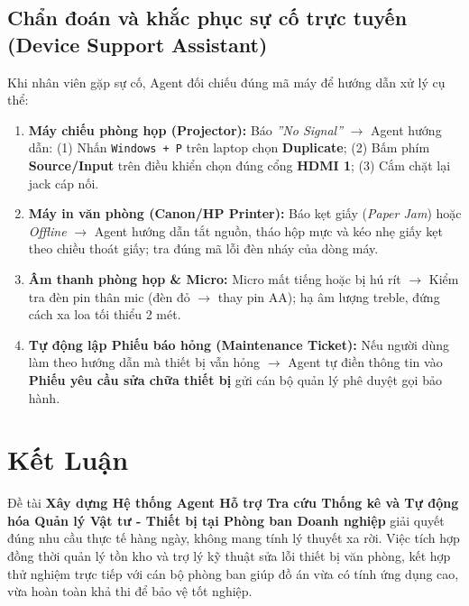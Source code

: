 \documentclass[11pt,a4paper]{article}
\begin{document}
\subsection{Chẩn đoán và khắc phục sự cố trực tuyến (Device Support Assistant)}
Khi nhân viên gặp sự cố, Agent đối chiếu đúng mã máy để hướng dẫn xử lý cụ thể:
\begin{enumerate}
    \item \textbf{Máy chiếu phòng họp (Projector):} Báo \textit{''No Signal''} $\rightarrow$ Agent hướng dẫn: (1) Nhấn \texttt{Windows + P} trên laptop chọn \textbf{Duplicate}; (2) Bấm phím \textbf{Source/Input} trên điều khiển chọn đúng cổng \textbf{HDMI 1}; (3) Cắm chặt lại jack cáp nối.
    \item \textbf{Máy in văn phòng (Canon/HP Printer):} Báo kẹt giấy (\textit{Paper Jam}) hoặc \textit{Offline} $\rightarrow$ Agent hướng dẫn tắt nguồn, tháo hộp mực và kéo nhẹ giấy kẹt theo chiều thoát giấy; tra đúng mã lỗi đèn nháy của dòng máy.
    \item \textbf{Âm thanh phòng họp \& Micro:} Micro mất tiếng hoặc bị hú rít $\rightarrow$ Kiểm tra đèn pin thân mic (đèn đỏ $\rightarrow$ thay pin AA); hạ âm lượng treble, đứng cách xa loa tối thiểu 2 mét.
    \item \textbf{Tự động lập Phiếu báo hỏng (Maintenance Ticket):} Nếu người dùng làm theo hướng dẫn mà thiết bị vẫn hỏng $\rightarrow$ Agent tự điền thông tin vào \textbf{Phiếu yêu cầu sửa chữa thiết bị} gửi cán bộ quản lý phê duyệt gọi bảo hành.
\end{enumerate}

\section{Kết Luận}
Đề tài \textbf{Xây dựng Hệ thống Agent Hỗ trợ Tra cứu Thống kê và Tự động hóa Quản lý Vật tư - Thiết bị tại Phòng ban Doanh nghiệp} giải quyết đúng nhu cầu thực tế hàng ngày, không mang tính lý thuyết xa rời. Việc tích hợp đồng thời quản lý tồn kho và trợ lý kỹ thuật sửa lỗi thiết bị văn phòng, kết hợp thử nghiệm trực tiếp với cán bộ phòng ban giúp đồ án vừa có tính ứng dụng cao, vừa hoàn toàn khả thi để bảo vệ tốt nghiệp.
\end{document}
